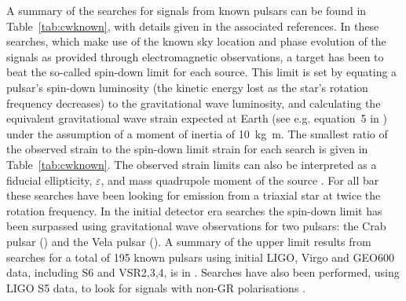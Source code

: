 A summary of the searches for signals from known pulsars can be found in Table~\ref{tab:cwknown}, with 
details given in the associated references. In these searches, which make use of the known sky location and 
phase evolution of the signals as provided through electromagnetic observations, a target has been to beat 
the so-called spin-down limit for each source. This limit is set by equating a pulsar's spin-down luminosity 
(the kinetic energy lost as the star's rotation frequency decreases) to the gravitational wave luminosity, 
and calculating the equivalent gravitational wave strain expected at Earth (see e.g. equation~5 in 
\cite{2014ApJ...785..119A}) under the assumption of a moment of inertia of 10~kg~m. The 
smallest ratio of the observed strain to the spin-down limit strain for each search is given in 
Table~\ref{tab:cwknown}. The observed strain limits can also be interpreted as a fiducial ellipticity, 
$\varepsilon$, and mass quadrupole moment of the source \cite{2005PhRvL..95u1101O}. For all bar 
\cite{2015MNRAS.453.4399P} these searches have been looking for emission from a triaxial star at twice the 
rotation frequency. In the initial detector era searches the spin-down limit has been surpassed using 
gravitational wave observations for two pulsars: the Crab pulsar \cite{Abbott:2008j} 
() and the Vela pulsar \cite{Abadie:2011b} (). A 
summary of the upper limit results from searches for a total of 195 known pulsars using initial LIGO, Virgo 
and GEO600 data, including S6 and VSR2,3,4, is in \cite{2014ApJ...785..119A}. Searches have also been 
performed, using LIGO S5 data, to look for signals with non-GR polarisations \cite{2015PhRvD..91h2002I}.

